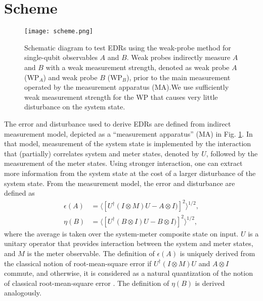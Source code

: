 \documentclass[%
reprint,
superscriptaddress,
 amsmath,amssymb,
 aps,
pra,
]{revtex4-2}
\begin{document}
\section{Scheme\label{sec:scheme}}
\begin{figure}[t] %
\centering
\texttt{[image: scheme.png]} 
\caption{Schematic diagram to test EDRs using the weak-probe method for single-qubit observables $A$ and $B$. 
Weak probes indirectly measure $A$ and $B$ with a weak measurement strength, denoted as weak probe $A$ (WP$_A$) and  weak probe $B$ (WP$_B$), prior to the main measurement operated by the measurement apparatus (MA).We use sufficiently weak measurement strength for the WP that causes very little disturbance on the system state.} 
\label{scheme} 
\end{figure}
The error and disturbance used to derive EDRs are defined from indirect measurement model, depicted as a ``measurement apparatus'' (MA) in Fig. \ref{scheme}. 
In that model, measurement of the system state is implemented by the interaction that (partially) correlates system and meter states, denoted by $U$, followed by the measurement of the meter states. 
Using stronger interaction, one can extract more information from the system state at the cost of a larger disturbance of the system state.
From the measurement model, the error and disturbance are defined as \cite{PhysRevA.67.042105}
\begin{equation}\label{error_disturbance}
    \begin{aligned}   
    \epsilon (A) &= \langle [ U^\dagger (I \otimes M) U  - A\otimes I)] ^2\rangle^{1/2}, \\
    \eta (B) &= \langle [ U^\dagger (B \otimes I) U  - B\otimes I)] ^2\rangle^{1/2} ,
    \end{aligned}
\end{equation}
where the average is taken over the system-meter composite state on input. 
$U$ is a unitary operator that provides interaction between the system and meter states, and $M$ is the meter observable.
The definition of $\epsilon(A)$ is uniquely derived from the classical notion of root-mean-square error if $U^\dagger (I \otimes M) U$ and $ A\otimes I$ commute, and otherwise, it is considered as a natural quantization of the notion of classical root-mean-square error \cite{PhysRevLett.112.020402}. 
The definition of $\eta(B)$ is derived analogously.
\end{document}
